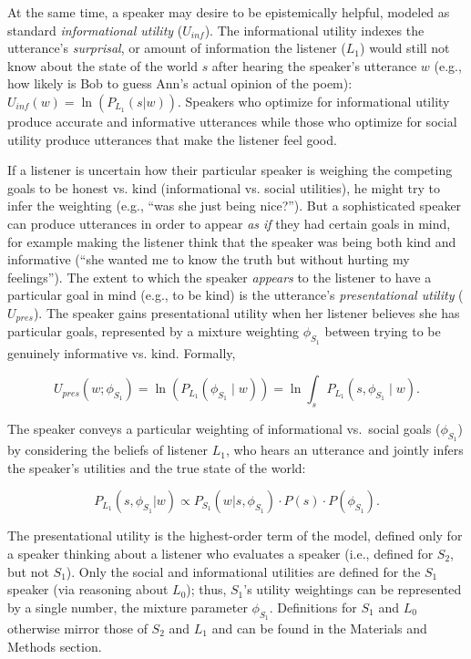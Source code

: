 \documentclass[9pt,twocolumn,twoside,lineno]{main_class_file}
\begin{document}
At the same time, a speaker may desire to be epistemically helpful, modeled as standard \emph{informational utility} (\(U_{inf}\)).
The informational utility indexes the utterance's \emph{surprisal}, or amount of information the listener (\(L_1\)) would still not know about the state of the world \(s\) after hearing the speaker's utterance \(w\) (e.g., how likely is Bob to guess Ann's actual opinion of the poem): \(U_{inf}(w) = \ln(P_{L_1}(s | w))\).
Speakers who optimize for informational utility produce accurate and informative utterances while those who optimize for social utility produce utterances that make the listener feel good.

If a listener is uncertain how their particular speaker is weighing the competing goals to be honest vs. kind (informational vs. social utilities), he might try to infer the weighting (e.g., ``was she just being nice?'').
But a sophisticated speaker can produce utterances in order to appear \emph{as if} they had certain goals in mind, for example making the listener think that the speaker was being both kind and informative (``she wanted me to know the truth but without hurting my feelings'').
The extent to which the speaker \emph{appears} to the listener to have a particular goal in mind (e.g., to be kind) is the utterance's \emph{presentational utility} (\(U_{pres}\)).
The speaker gains presentational utility when her listener believes she
has particular goals, represented by a mixture weighting \(\phi_{S_1}\) between trying to be genuinely informative vs. kind.
Formally,

\begin{equation}
U_{pres}(w; \phi_{S_1}) = \ln(P_{L_1}(\phi_{S_1} \mid w)) = \ln \int_s P_{L_1}(s, \phi_{S_1} \mid w).
\end{equation}

\noindent The speaker conveys a particular weighting of informational
vs.~social goals (\(\phi_{S_1}\)) by considering the
beliefs of listener \(L_1\), who hears an utterance and jointly infers
the speaker's utilities and the true state of the world:

\begin{equation}
P_{L_1}(s, \phi_{S_1} | w) \propto P_{S_1}(w | s, \phi_{S_1}) \cdot P(s) \cdot P(\phi_{S_1}).
\end{equation}

\noindent The presentational utility is the highest-order term of the model, defined only for a speaker thinking about a listener who evaluates a speaker
(i.e., defined for \(S_2\), but not \(S_1\)).
Only the social and informational utilities are defined for the \(S_1\) speaker (via reasoning about \(L_0\)); thus, \(S_1\)'s utility weightings can be represented by a single number, the mixture parameter \(\phi_{S_1}\).
Definitions for \(S_1\) and  \(L_0\) otherwise mirror those of  \(S_2\) and  \(L_1\) and can be found in the Materials and Methods section.
\end{document}
